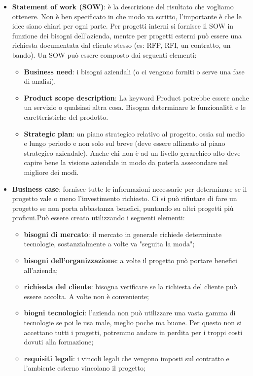 \begin{itemize}
	\item \textbf{Statement of work (SOW)}: è la descrizione del risultato che vogliamo ottenere. Non è ben specificato in che modo va scritto, l'importante è che le idee siano chiari per ogni parte.
	Per progetti interni si fornisce il SOW in funzione dei bisogni dell'azienda, mentre per progetti esterni può essere una richiesta documentata dal cliente stesso (es: RFP, RFI, un contratto, un bando). Un SOW può essere composto dai seguenti elementi:
	\begin{itemize}
		\item \textbf{Business need}: i bisogni aziendali (o ci vengono forniti o serve una fase di analisi).
		\item \textbf{Product scope description}: La keyword Product potrebbe essere anche un servizio o qualsiasi altra cosa. Bisogna determinare le funzionalità e le caretteristiche del prodotto.
		\item \textbf{Strategic plan}: un piano strategico relativo al progetto, ossia sul medio e lungo periodo e non solo sul breve (deve essere allineato al piano strategico aziendale). Anche chi non è ad un livello gerarchico alto deve capire bene la visione  aziendale in modo da poterla assecondare nel migliore dei modi.
	\end{itemize}
	\item \textbf{Business case}: fornisce tutte le informazioni necessarie per determinare se il progetto vale o meno l'investimento richiesto. Ci si può rifiutare di fare un progetto se non porta abbastanza benefici, puntando su altri progetti più proficui.Può essere creato utilizzando i seguenti elementi:
	\begin{itemize}
		\item \textbf{bisogni di mercato}: il mercato in generale richiede determinate tecnologie, sostanzialmente a volte va "seguita la moda";
		\item \textbf{bisogni dell'organizzazione}: a volte il progetto può portare benefici all'azienda;
		\item \textbf{richiesta del cliente}:  bisogna verificare se la richiesta del cliente può essere accolta. A volte non è conveniente;
		\item \textbf{biogni tecnologici}: l'azienda non può utilizzare una vasta gamma di tecnologie se poi le usa male, meglio poche ma buone. Per questo non si accettano tutti i progetti, potremmo andare in perdita per i troppi costi dovuti alla formazione;
		\item \textbf{requisiti legali}: i vincoli legali che vengono imposti sul contratto e l'ambiente esterno vincolano il progetto;

\end{itemize}
\end{itemize}
